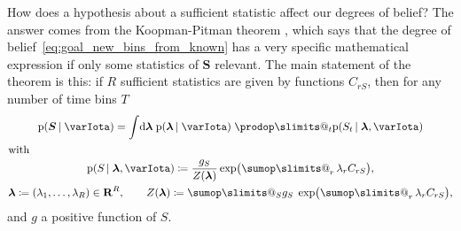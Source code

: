 \documentclass[\ifafour a4paper,12pt,\else a5paper,10pt,\fi%
onecolumn,oneside,article,%
british%
]{memoir}
\makeatletter
\theoremstyle{remark}
\theoremstyle{innote}
\def\sum{\DOTSI\sumop\slimits@}
\def\prod{\DOTSI\prodop\slimits@}
\newcommand*{\citep}{\parencites}
\newcommand*{\di}{\mathrm{d}}%
\newcommand*{\RR}{\bm{\mathrm{R}}}
\newcommand*{\defd}{\coloneqq}
\newcommand*{\pf}{\mathrm{p}}%
\renewcommand*{\|}{\nonscript\,\vert\nonscript\;\mathopen{}}
\newcommand*{\tsum}{\mathop{\textstyle\sum}\nolimits}
\newcommand*{\dob}{degree of belief}
\newcommand*{\dobs}{degrees of belief}
\newcommand*{\yS}{S}
\newcommand*{\ySt}{\bm{\yS}}
\newcommand*{\yll}{\lambda}
\newcommand*{\yl}{\bm{\lambda}}
\newcommand*{\yg}{g}
\newcommand*{\yI}{\varIota}
\makeatother
\begin{document}
How does a hypothesis about a sufficient statistic affect our \dobs? The
answer comes from the Koopman-Pitman theorem
\citep{koopman1936,pitman1936}[see
also][]{darmois1935,barankinetal1963,denny1967,hipp1974,lauritzen1974,lauritzen1984,lauritzen1982_r1988}[for
the discrete version:][]{fraser1963,andersen1970}, which says that the
\dob~\eqref{eq:goal_new_bins_from_known} has a very specific mathematical
expression if only some statistics of $\ySt$ relevant. The main statement
of the theorem is this: if $R$ sufficient statistics are given by functions
$C_{r\yS}$, then for any number of time bins $T$
\begin{subequations}
  \label{eq:koopman-pitman}
  \begin{gather}
    \pf( \ySt \| \yI) =
    \int\!\di\yl\; \pf(\yl \| \yI)\; \prod_{t}\pf(\yS_{t} \| \yl, \yI)
    \label{eq:koopman-pitman_integral}
    \\
    \shortintertext{with}
    \pf(\yS \| \yl, \yI) \defd \frac{\yg_{\yS}}{Z(\yl)}
    \exp\bigl(\tsum_{r} \yll_r C_{r\yS}\bigr),
    \label{eq:koopman-pitman_likelihood}
    \\
    \yl \defd (\yll_1, \dotsc, \yll_R) \in \RR^{R},
    \qquad
    Z(\yl) \defd \sum_{\yS}
    \yg_{\yS}\;\exp\bigl(\tsum_{r} \yll_r C_{r\yS}\bigr),
  \end{gather}
\end{subequations}
and $\yg$ a positive function of $\yS$.
\end{document}
